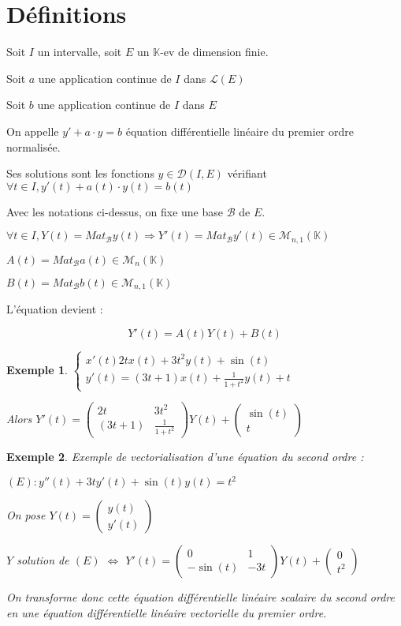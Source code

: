 \documentclass[a4paper,12pt]{book}
\newcommand{\Def}[2]{\begin{tcolorbox}[sharp corners, colback=white,colframe=blue!90!black!75, title=Définition : #1]#2\end{tcolorbox}}
\newtheorem{Exe}{Exemple}[section]
\def\K{\mathbb{K}}
\begin{document}
\section{Définitions}
\Def{Premier ordre}{Soit $I$ un intervalle, soit $E$ un $\K$-ev de dimension finie.
\par Soit $a$ une application continue de $I$ dans $\mathcal{L}(E)$
\par Soit $b$ une application continue de $I$ dans $E$
\par On appelle $y' + a\cdot y = b$ équation différentielle linéaire du premier ordre normalisée.
\par Ses solutions sont les fonctions $y\in\mathcal{D}(I, E)$ vérifiant $\forall t\in I, y'(t)+a(t)\cdot y(t)=b(t)$}
\Def{Traduction matricielle}{Avec les notations ci-dessus, on fixe une base $\mathcal{B}$ de $E$.
\par $\forall t\in I, Y(t) = Mat_{\mathcal{B}}y(t) \Rightarrow Y'(t) = Mat_\mathcal{B}y'(t)\in\mathcal{M}_{n,1}(\K)$
\par $A(t) = Mat_\mathcal{B}a(t)\in\mathcal{M}_n(\K)$
\par $B(t) = Mat_\mathcal{B}b(t)\in\mathcal{M}_{n,1}(\K)$
\par L'équation devient :
\par $$Y'(t) = A(t)Y(t) +B(t)$$}
\begin{Exe}
$\left\{\begin{array}{l}x'(t) 2tx(t) + 3t^2y(t) + \sin(t) \\ y'(t) =  (3t+1)x(t)  + \frac{1}{1+t^2}y(t) + t\end{array}\right.$
\par Alors $Y'(t) =\begin{pmatrix} 2t & 3t^2 \\ (3t+1) & \frac{1}{1+t^2}\end{pmatrix}Y(t) +\begin{pmatrix}\sin(t) \\ t\end{pmatrix}$
\end{Exe}
\begin{Exe}
Exemple de vectorialisation d'une équation du second ordre :
\par $(E) : y''(t) + 3ty'(t) + \sin(t)y(t) = t^2$
\par On pose $Y(t) = \begin{pmatrix} y(t) \\ y'(t)\end{pmatrix}$
\par $Y$ solution de $(E)$ $\Leftrightarrow$ $Y'(t) = \begin{pmatrix} 0 & 1 \\ -\sin(t) & -3t \end{pmatrix}Y(t) + \begin{pmatrix} 0\\ t^2 \end{pmatrix}$
\par On transforme donc cette équation différentielle linéaire scalaire du second ordre en une équation différentielle linéaire vectorielle du premier ordre.
\end{Exe}
\end{document}
